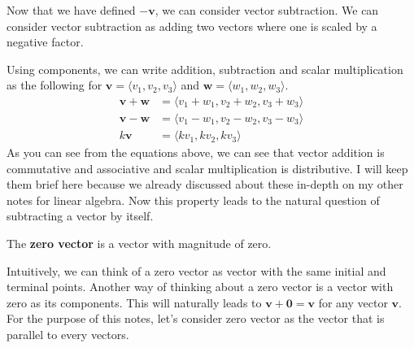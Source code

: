 \documentclass[../../main.tex]{subfiles}
\begin{document}
Now that we have defined $-\mathbf{v}$, we can consider vector
subtraction. We can consider vector subtraction as adding two vectors
where one is scaled by a negative factor.

\begin{figure}[H]
\centering
{}
\end{figure}

Using components, we can write addition, subtraction and scalar
multiplication as the following for $\mathbf{v} = \langle v_1, v_2,
v_3 \rangle$ and $\mathbf{w} = \langle w_1, w_2, w_3 \rangle$.
\begin{align*}
    \mathbf{v} + \mathbf{w}
    &= \langle v_1 + w_1, v_2 + w_2, v_3 + w_3 \rangle \\
    \mathbf{v} - \mathbf{w}
    &= \langle v_1 - w_1, v_2 - w_2, v_3 - w_3 \rangle \\
    k\mathbf{v}
    &= \langle kv_1, kv_2, kv_3 \rangle
\end{align*}
As you can see from the equations above, we can see that vector
addition is commutative and associative and scalar multiplication is
distributive. I will keep them brief here because we already discussed
about these in-depth on my other notes for linear algebra. Now this
property leads to the natural question of subtracting a vector by
itself.

\begin{definition}{}{}
The \textbf{zero vector} is a vector with magnitude of zero.
\end{definition}

Intuitively, we can think of a zero vector as vector with the same
initial and terminal points. Another way of thinking about a zero
vector is a vector with zero as its components. This will naturally
leads to $\mathbf{v} + \mathbf{0} = \mathbf{v}$ for any vector
$\mathbf{v}$. For the purpose of this notes, let's consider zero
vector as the vector that is parallel to every vectors.
\end{document}
